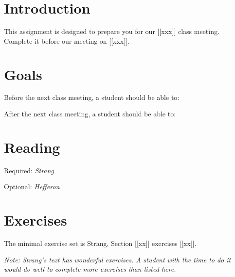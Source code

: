 \documentclass[12pt,letterpaper]{article}
\theoremstyle{definition}
\begin{document}
\setlength{\parskip}{1ex plus 0.5ex minus 0.2ex}
\setlength{\parindent}{0pt}

\pagestyle{fancy}
\cfoot{}

\section*{Introduction}
This assignment is designed to prepare you for our [[xxx]] class meeting.  Complete it before our meeting on [[xxx]].

\section*{Goals}
Before the next class meeting, a student should be able to:
\begin{compactitem}
\item 
\item 
\item 
\end{compactitem}
After the next class meeting, a student should be able to:
\begin{compactitem}
\item 
\end{compactitem}

\section*{Reading}
\begin{compactdesc}
\item[Required:] \emph{Strang} 
\item[Optional:] \emph{Hefferon} 
\end{compactdesc}

\section*{Exercises}
The minimal exercise set is Strang, Section [[xx]] exercises [[xx]].

\emph{Note: Strang's text has wonderful exercises. A student with the time to do it would do well to complete more exercises than listed here.}


\end{document}
